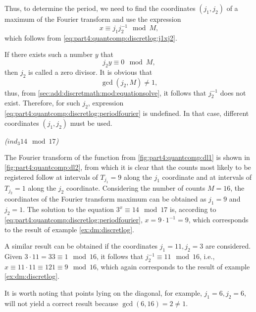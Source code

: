 Thus, to determine the period, we need to find the coordinates $(j_1, j_2)$ of a maximum of the Fourier transform and use the expression 
\begin{equation}
x \equiv j_1 j_2^{-1} \mod M,
\label{eq:part4:quantcomp:discretlog:periodfourier}
\end{equation}
which follows from \eqref{eq:part4:quantcomp:discretlog:j1xj2}.

\begin{remark}
If there exists such a number $y$ that 
\[
j_2 y \equiv 0 \mod M,
\]
then $j_2$ is called a zero divisor. 
It is obvious that 
\[
\gcd\left(j_2, M\right) \ne 1,
\]
thus, from \autoref{sec:add:discretmath:mod:equationsolve}, it follows that $j_2^{-1}$ does not exist. Therefore, for such $j_2$, expression \eqref{eq:part4:quantcomp:discretlog:periodfourier} is undefined. In that case, different coordinates $(j_1, j_2)$ must be used. 
\end{remark}

\begin{example}
\emph{($ind_3{14} \mod{17}$)}


The Fourier transform of the function from \autoref{fig:part4:quantcomp:dl1} is shown in \autoref{fig:part4:quantcomp:dl2}, from which it is clear that the counts most likely to be registered follow at intervals of $T_{j_1} = 9$ along the $j_1$ coordinate and at intervals of $T_{j_2} = 1$ along the $j_2$ coordinate. Considering the number of counts $M=16$, the coordinates of the Fourier transform maximum can be obtained as $j_1 = 9$ and $j_2 = 1$. The solution to the equation $3^x \equiv 14 \mod 17$ is, according to \eqref{eq:part4:quantcomp:discretlog:periodfourier}, $x = 9 \cdot 1^{-1} = 9$, which corresponds to the result of example \ref{ex:dm:discretlog}.

A similar result can be obtained if the coordinates $j_1 = 11, j_2 = 3$ are considered. Given $3 \cdot 11 = 33 \equiv 1 \mod 16$, it follows that $j_2^{-1} \equiv 11 \mod 16$, i.e., $x \equiv 11 \cdot 11 \equiv 121 \equiv 9 \mod 16$, which again corresponds to the result of example \ref{ex:dm:discretlog}.

It is worth noting that points lying on the diagonal, for example, $j_1 = 6, j_2 = 6$, will not yield a correct result because $\gcd\left(6, 16\right) = 2 \ne 1$.

\label{ex:part4:quantcomp:discretlog:periodfinding}
\end{example}

